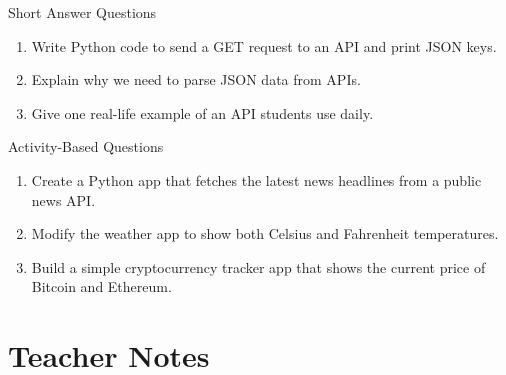 \begin{exercise}{Short Answer Questions}
\begin{enumerate}
    \item Write Python code to send a GET request to an API and print JSON keys.  
    \item Explain why we need to parse JSON data from APIs.  
    \item Give one real-life example of an API students use daily.  
\end{enumerate}
\end{exercise}

\begin{exercise}{Activity-Based Questions}
\begin{enumerate}
    \item Create a Python app that fetches the latest news headlines from a public news API.  
    \item Modify the weather app to show both Celsius and Fahrenheit temperatures.  
    \item Build a simple cryptocurrency tracker app that shows the current price of Bitcoin and Ethereum.  
\end{enumerate}
\end{exercise}

\section{Teacher Notes}

